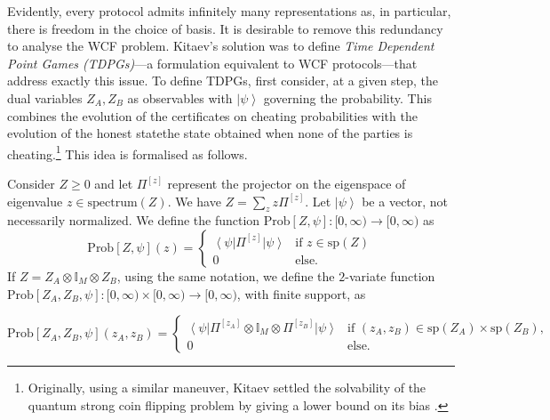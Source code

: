 \documentclass{article}
\begin{document}
Evidently, every protocol admits infinitely many representations as, in particular, there is freedom in the choice of basis. It is desirable to remove this redundancy to analyse the WCF problem.
%
%
%
%
%
%
%
Kitaev's solution was to define \emph{Time Dependent Point Games (TDPGs)}---a formulation equivalent to WCF protocols---that address exactly this issue. To define TDPGs, %
first consider, at a given step, the dual variables $Z_{A},Z_{B}$ as observables with
$\left|\psi\right\rangle $ governing the probability. This combines
the evolution of the certificates on cheating probabilities with the
evolution of the honest state\textemdash the state obtained when none of the parties is cheating.\footnote{Originally, using a similar
  maneuver, Kitaev settled the solvability of the quantum strong coin flipping
  problem by giving a lower bound on its bias \cite{Kitaev03}.}  This idea is formalised as follows.  %
%
\begin{definition}[Prob]
  Consider $Z\ge0$ and let $\Pi^{[z]}$ represent the projector on
  the eigenspace of eigenvalue $z\in\text{spectrum}(Z)$. We have $Z=\sum_{z}z\Pi^{[z]}$.
  Let $\left|\psi\right\rangle $ be a
  vector, not necessarily normalized. We define the function  $\text{Prob}[Z,\psi]:[0,\infty)\to[0,\infty)$
  as
  \begin{displaymath}
    \text{Prob}[Z,\psi](z)=\begin{cases}
      \left\langle \psi\right|\Pi^{[z]}\left|\psi\right\rangle & \text{if }z\in\text{sp}(Z) \\
      0                                                        & \text{else}.
    \end{cases}
  \end{displaymath}
  If $Z=Z_{A}\otimes\mathbb{I}_{M}\otimes Z_{B}$, using the
  same notation, we define the $2$-variate function
  $\text{Prob}[Z_{A},Z_{B},\psi]:[0,\infty)\times[0,\infty)\to[0,\infty)$, with finite support,
  as \begin{small}
    \begin{displaymath}
      \text{Prob}[Z_{A},Z_{B},\psi](z_{A},z_{B})=\begin{cases}
        \left\langle \psi\right|\Pi^{[z_{A}]}\otimes\mathbb{I}_{M}\otimes\Pi^{[z_{B}]}\left|\psi\right\rangle & \text{if }(z_{A},z_{B})\in\text{sp}(Z_{A})\times\text{sp}(Z_{B}), \\
        0                                                                                                     & \text{else}.
      \end{cases}
    \end{displaymath}
  \end{small}

  \label{def:prob}
\end{definition}
\end{document}
